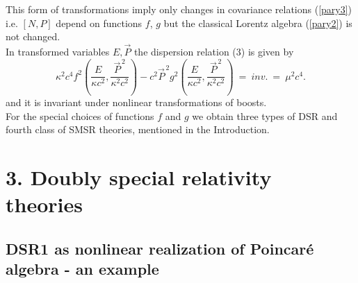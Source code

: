 \documentclass[a4paper,12pt]{article} \usepackage{times}
\begin{document}
This form of transformations imply only changes in covariance
relations (\ref{pary3}) i.e. $[N , P]$ depend on functions $f$,
$g$ but the classical Lorentz algebra (\ref{pary2}) is not
changed.\\In transformed variables $E, \vec{P}$ the dispersion
relation (3) is given by
\begin{equation}
\kappa^2 c^4 f^2\left(\frac{E}{\kappa c^2} ,
\frac{\vec{P}^{\,2}}{\kappa^2 c^2}\right) - c^2 \vec{P}^{\,2}  g^2
\left(\frac{E}{\kappa c^2} , \frac{\vec{P}^{\,2}}{\kappa^2
c^2}\right) \ = \ inv. \ = \ \mu^2 c^4 .
\end{equation}
and it is invariant under nonlinear transformations of
boosts.
\\
For the special choices of functions $f$ and $g$ we obtain three
types of DSR and fourth class of SMSR theories, mentioned in the
Introduction.

\section{\bf 3. Doubly special relativity theories}



\subsection{DSR1 as nonlinear realization of Poincar\'{e}
algebra - an example}
\end{document}
